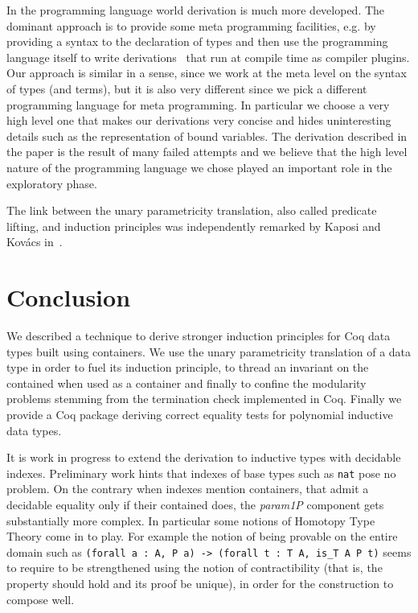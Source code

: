 \documentclass[a4paper,UKenglish,cleveref, autoref]{lipics-v2019}
\newcommand{\derive}[1]{\emph{#1}}
\begin{document}
In the programming language world derivation is much more developed.
The dominant approach is to provide some meta programming facilities,
e.g. by providing a syntax to the declaration of types and then use the
programming language itself to write 
derivations~\cite{Sheard:2002:TMH:636517.636528} that run at compile
time as compiler plugins. 
Our approach is similar in a sense, since we work at the meta level on
the syntax of types (and terms), but it is also very different since
we pick a different programming language for meta programming.  In
particular we choose a very high level one that makes our derivations
very concise and hides uninteresting details such as the
representation of bound variables.
The derivation described in the paper is the result of many failed
attempts and we believe that the high level nature of the programming
language we chose played an important role in the exploratory phase.

The link between the unary parametricity translation, also called predicate lifting, and induction principles was independently remarked by Kaposi and Kov\'acs in~\cite{DBLP:conf/rta/KaposiK18}.

\section{Conclusion} %
\label{sec:conclusion}

We described a technique to derive stronger induction principles for Coq data
types built using containers. We use the unary parametricity translation of a
data type in order to fuel its induction principle, to thread an invariant on
the contained when used as a container and finally to confine the modularity
problems stemming from the termination check implemented in Coq.  Finally we
provide a Coq package deriving correct equality tests for polynomial inductive
data types.

It is work in progress to extend the derivation to 
inductive types with decidable indexes. Preliminary work hints that
indexes of base types such as \lstinline+nat+ pose no problem.
On the contrary when indexes mention containers, that admit a decidable
equality only if their contained does,
the \derive{param1P} component gets 
substantially more complex. In particular some notions of Homotopy Type Theory
come in to play. For example the notion of being provable on the entire domain
such as \lstinline+(forall a : A, P a) -> (forall t : T A, is_T A P t)+ seems
to require to be strengthened using the notion of contractibility (that
is, the property should hold and its proof be unique), in order for the
construction to compose well.
\end{document}
